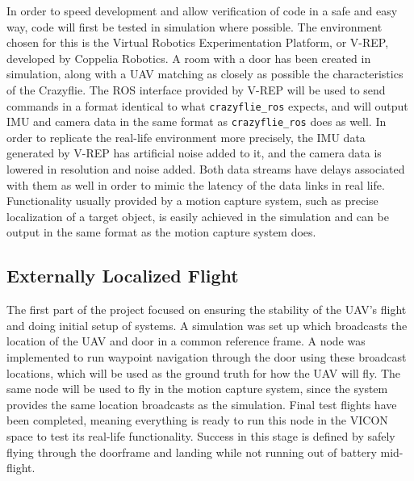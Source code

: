 \documentclass[12pt]{article}
\begin{document}
In order to speed development and allow verification of code in a safe and easy way, code will first be tested in simulation where possible. The environment chosen for this is the Virtual Robotics Experimentation Platform, or V-REP, developed by Coppelia Robotics. A room with a door has been created in simulation, along with a UAV matching as closely as possible the characteristics of the Crazyflie. The ROS interface provided by V-REP will be used to send commands in a format identical to what \verb|crazyflie_ros| expects, and will output IMU and camera data in the same format as \verb|crazyflie_ros| does as well. In order to replicate the real-life environment more precisely, the IMU data generated by V-REP has artificial noise added to it, and the camera data is lowered in resolution and noise added. Both data streams have delays associated with them as well in order to mimic the latency of the data links in real life. Functionality usually provided by a motion capture system, such as precise localization of a target object, is easily achieved in the simulation and can be output in the same format as the motion capture system does.

\subsection{Externally Localized Flight}
The first part of the project focused on ensuring the stability of the UAV's flight and doing initial setup of systems. A simulation was set up which broadcasts the location of the UAV and door in a common reference frame. A node was implemented to run waypoint navigation through the door using these broadcast locations, which will be used as the ground truth for how the UAV will fly. The same node will be used to fly in the motion capture system, since the system provides the same location broadcasts as the simulation. Final test flights have been completed, meaning everything is ready to run this node in the VICON space to test its real-life functionality. Success in this stage is defined by safely flying through the doorframe and landing while not running out of battery mid-flight. 
\end{document}
